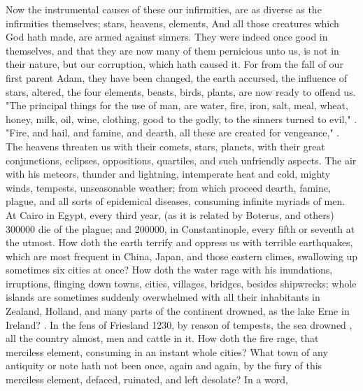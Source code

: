 Now the instrumental causes of these our infirmities, are as diverse as the
infirmities themselves; stars, heavens, elements, \etc{} And all those
creatures which God hath made, are armed against sinners. They were indeed once
good in themselves, and that they are now many of them pernicious unto us, is
not in their nature, but our corruption, which hath caused it. For from the
fall of our first parent Adam, they have been changed, the earth accursed, the
influence of stars, altered, the four elements, beasts, birds, plants, are now
ready to offend us. "The principal things for the use of man, are water, fire,
iron, salt, meal, wheat, honey, milk, oil, wine, clothing, good to the godly,
to the sinners turned to evil," . "Fire, and
hail, and famine, and dearth, all these are created for vengeance,"
. The heavens threaten us with their comets,
stars, planets, with their great conjunctions, eclipses, oppositions,
quartiles, and such unfriendly aspects. The air with his meteors, thunder and
lightning, intemperate heat and cold, mighty winds, tempests, unseasonable
weather; from which proceed dearth, famine, plague, and all sorts of epidemical
diseases, consuming infinite myriads of men. At Cairo in Egypt, every third
year, (as it is related by Boterus, and others)
300\thinspace{}000 die of the plague; and 200\thinspace{}000, in
Constantinople, every fifth or seventh at the utmost. How doth the earth
terrify and oppress us with terrible earthquakes, which are most frequent in
China, Japan, and those eastern climes, swallowing up
sometimes six cities at once? How doth the water rage with his inundations,
irruptions, flinging down towns, cities, villages, bridges, \etc{} besides
shipwrecks; whole islands are sometimes suddenly overwhelmed with all their
inhabitants in Zealand, Holland, and many parts of the
continent drowned, as the lake Erne in Ireland?
. In the fens of Friesland
1230, by reason of tempests, the sea drowned , all the country almost, men and cattle
in it. How doth the fire rage, that merciless element, consuming in an instant
whole cities? What town of any antiquity or note hath not been once, again and
again, by the fury of this merciless element, defaced, ruinated, and left
desolate? In a word,

